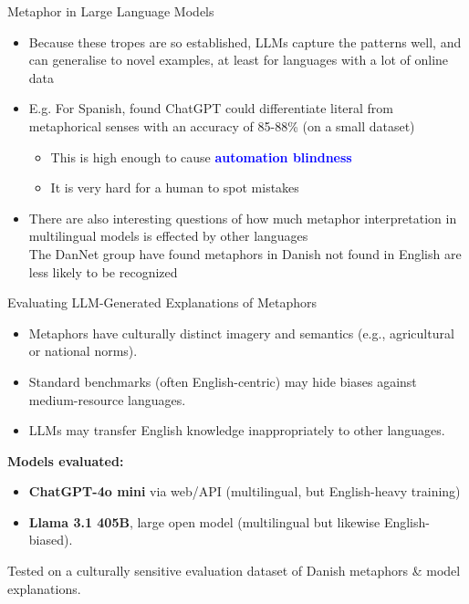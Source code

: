 \documentclass[xetex]{beamer}
\newcommand{\txx}[1]{\textbf{\textcolor{blue}{#1}}}
\begin{document}
\begin{frame}{Metaphor in Large Language Models}
  \begin{itemize}
  \item Because these tropes are so established, LLMs capture the
    patterns well, and can generalise to novel examples, at least for languages with a lot of online data
  \item E.g. For Spanish, \citet{puraivan2024metaphor} found ChatGPT
    could differentiate literal from metaphorical senses with an
    accuracy of 85-88\% (on a small dataset)
    \begin{itemize}
    \item This is high enough to cause \txx{automation blindness}
    \item It is very hard for a human to spot mistakes
    \end{itemize}
  \item There are also interesting questions of how much metaphor
    interpretation in multilingual models is effected by other languages
    \\ The DanNet group have found metaphors in Danish not found in English are less likely to be recognized

  \end{itemize}%

  
 \end{frame}

 \begin{frame}{Evaluating LLM-Generated Explanations of Metaphors
     \citep{Pedersen:Soerensen:Nimb:Hansen:Olsen:Al-Laith:2025} }

\begin{itemize}
  \item Metaphors have culturally distinct imagery and semantics (e.g., agricultural or national norms).
  \item Standard benchmarks (often English-centric) may hide biases against medium-resource languages.
  \item  LLMs may transfer English knowledge inappropriately to other languages.
\end{itemize}

\smallskip
\textbf{Models evaluated:}
\begin{itemize}
  \item \textbf{ChatGPT-4o mini} via web/API (multilingual, but English-heavy training)
  \item \textbf{Llama 3.1 405B}, large open model (multilingual but likewise English-biased).
\end{itemize}

\smallskip
Tested on a  culturally sensitive evaluation dataset of Danish metaphors \& model explanations.
\end{frame}
\end{document}
